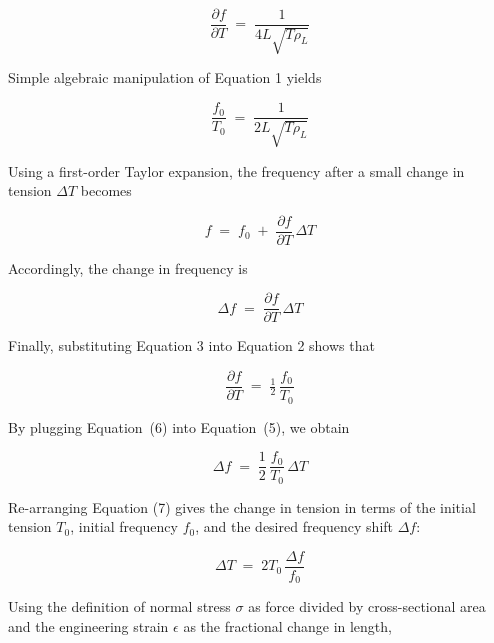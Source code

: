\documentclass[12pt]{article}
\theoremstyle{definition} %
\theoremstyle{plain} %
\begin{document}
\begin{equation}
  \frac{\partial f}{\partial T}
    \;=\;
  \frac{1}{4L\sqrt{T\rho_L}}
  \tag{2}
\end{equation}

Simple algebraic manipulation of Equation 1 yields

\begin{equation}
  \frac{f_0}{T_0}
    \;=\;
  \frac{1}{2L\sqrt{T\rho_L}}
  \tag{3}
\end{equation}

Using a first-order Taylor expansion, the frequency after a small change
in tension $\Delta T$ becomes

\begin{equation}
  f \;=\; f_0 \;+\;
       \frac{\partial f}{\partial T}\,\Delta T
  \tag{4}
\end{equation}

Accordingly, the change in frequency is

\begin{equation}
  \Delta f
    \;=\;
  \frac{\partial f}{\partial T}\,\Delta T
  \tag{5}
\end{equation}

Finally, substituting Equation 3 into Equation 2 shows that

\begin{equation}
  \frac{\partial f}{\partial T}
    \;=\;
  \tfrac12\,\frac{f_0}{T_0}
  \tag{6}
\end{equation}


By plugging Equation~(6) into Equation~(5), we obtain

\begin{equation}
  \Delta f \;=\; \frac{1}{2}\,\frac{f_0}{T_0}\,\Delta T
  \tag{7}
\end{equation}

Re-arranging Equation (7) gives the change in tension in terms of the
initial tension $T_0$, initial frequency $f_0$, and the desired
frequency shift $\Delta f$:

\begin{equation}
  \Delta T \;=\; 2T_0\,\frac{\Delta f}{f_0}
  \tag{8}
\end{equation}

Using the definition of normal stress $\sigma$ as force divided by
cross-sectional area and the engineering strain $\epsilon$ as the
fractional change in length,
\end{document}

